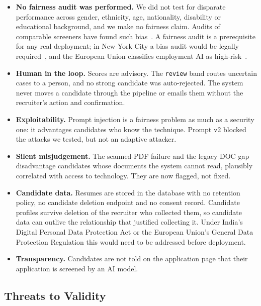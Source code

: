 \documentclass[conference]{IEEEtran}
\begin{document}
\begin{itemize}
\item \textbf{No fairness audit was performed.} We did not test for disparate
performance across gender, ethnicity, age, nationality, disability or
educational background, and we make no fairness claim. Audits of comparable
screeners have found such bias~\cite{b13,b14}. A fairness audit is a
prerequisite for any real deployment; in New York City a bias audit would be
legally required~\cite{b15}, and the European Union classifies employment AI as
high-risk~\cite{b16}.
\item \textbf{Human in the loop.} Scores are advisory. The \texttt{review} band
routes uncertain cases to a person, and no strong candidate was auto-rejected.
The system never moves a candidate through the pipeline or emails them without
the recruiter's action and confirmation.
\item \textbf{Exploitability.} Prompt injection is a fairness problem as much as
a security one: it advantages candidates who know the technique. Prompt v2
blocked the attacks we tested, but not an adaptive attacker.
\item \textbf{Silent misjudgement.} The scanned-PDF failure and the legacy DOC
gap disadvantage candidates whose documents the system cannot read, plausibly
correlated with access to technology. They are now flagged, not fixed.
\item \textbf{Candidate data.} Resumes are stored in the database with no
retention policy, no candidate deletion endpoint and no consent record.
Candidate profiles survive deletion of the recruiter who collected them, so
candidate data can outlive the relationship that justified collecting it. Under
India's Digital Personal Data Protection Act or the European Union's General
Data Protection Regulation this would need to be addressed before deployment.
\item \textbf{Transparency.} Candidates are not told on the application page
that their application is screened by an AI model.
\end{itemize}

\subsection{Threats to Validity}
\end{document}
